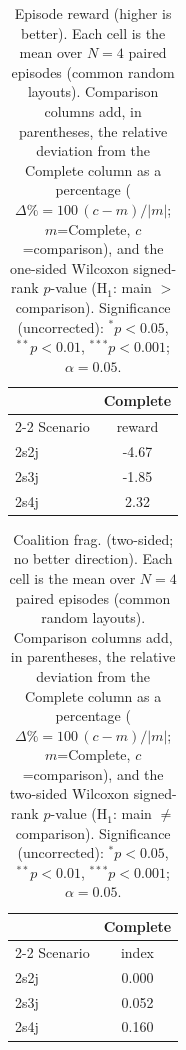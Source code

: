 \begin{table}[ht]
  \centering
  \caption{Episode reward (higher is better). Each cell is the mean over $N=4$ paired episodes (common random layouts). Comparison columns add, in parentheses, the relative deviation from the Complete column as a percentage ($\Delta\%=100\,(c-m)/|m|$; $m$=Complete, $c$=comparison), and the one-sided Wilcoxon signed-rank $p$-value (H$_1$: main $>$ comparison). Significance (uncorrected): $^{*}p<0.05$, $^{**}p<0.01$, $^{***}p<0.001$; $\alpha=0.05$.}
  \label{tab:wilcoxon-reward}
  \small
  \begin{tabular}{l c}
    \toprule
     & Complete \\
    \cmidrule(lr){2-2}
    Scenario & {reward} \\
    \midrule
    2s2j & -4.67 \\
    2s3j & -1.85 \\
    2s4j & 2.32 \\
    \bottomrule
  \end{tabular}
\end{table}

\begin{table}[ht]
  \centering
  \caption{Coalition frag. (two-sided; no better direction). Each cell is the mean over $N=4$ paired episodes (common random layouts). Comparison columns add, in parentheses, the relative deviation from the Complete column as a percentage ($\Delta\%=100\,(c-m)/|m|$; $m$=Complete, $c$=comparison), and the two-sided Wilcoxon signed-rank $p$-value (H$_1$: main $\neq$ comparison). Significance (uncorrected): $^{*}p<0.05$, $^{**}p<0.01$, $^{***}p<0.001$; $\alpha=0.05$.}
  \label{tab:wilcoxon-fragmentation}
  \small
  \begin{tabular}{l c}
    \toprule
     & Complete \\
    \cmidrule(lr){2-2}
    Scenario & {index} \\
    \midrule
    2s2j & 0.000 \\
    2s3j & 0.052 \\
    2s4j & 0.160 \\
    \bottomrule
  \end{tabular}
\end{table}
